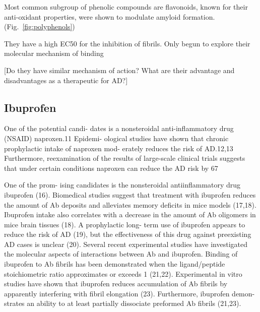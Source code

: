 Most common subgroup of phenolic compounds are flavonoids, known for their anti-oxidant properties, were shown to modulate amyloid formation.(Fig.~\ref{fig:polyphenols})


They have a high EC50 for the inhibition of fibrils.  Only begun to explore their molecular mechanism of binding

[Do they have similar mechanism of action? What are their advantage and disadvantages as a therapeutic for AD?]

\subsection{Ibuprofen}

One of the potential candi- dates is a nonsteroidal anti-inflammatory drug (NSAID) naproxen.11 Epidemi- ological studies have shown that chronic prophylactic intake of naproxen mod- erately reduces the risk of AD.12,13 Furthermore, reexamination of the results of large-scale clinical trials suggests that under certain conditions naproxen can reduce the AD risk by 67%

One of the prom- ising candidates is the nonsteroidal antiinflammatory drug ibuprofen (16). Biomedical studies suggest that treatment with ibuprofen reduces the amount of Ab deposits and alleviates memory deficits in mice models (17,18). Ibuprofen intake also correlates with a decrease in the amount of Ab oligomers in mice brain tissues (18). A prophylactic long-
term use of ibuprofen appears to reduce the risk of AD (19), but the effectiveness of this drug against preexisting AD cases is unclear (20). Several recent experimental studies have investigated the molecular aspects of interactions between Ab and ibuprofen. Binding of ibuprofen to Ab fibrils has been demonstrated when the ligand/peptide stoichiometric ratio approximates or exceeds 1 (21,22). Experimental in vitro studies have shown that ibuprofen reduces accumulation of Ab fibrils by apparently interfering with fibril elongation (23). Furthermore, ibuprofen demon- strates an ability to at least partially dissociate preformed Ab fibrils (21,23).



